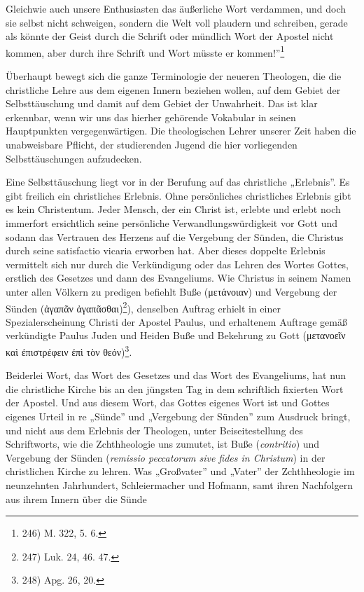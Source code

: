 \hfill {}\par Gleichwie auch unsere Enthusiasten das äußerliche Wort verdammen, und doch sie selbst nicht schweigen, sondern die Welt voll plaudern und schreiben, gerade als könnte der Geist durch die Schrift oder mündlich Wort der Apostel nicht kommen, aber durch ihre Schrift und Wort müsste er kommen!''\footnote{246) M. 322, 5. 6.}\par Überhaupt bewegt sich die ganze Terminologie der neueren Theologen, die die christliche Lehre aus dem eigenen Innern beziehen wollen, auf dem Gebiet der Selbsttäuschung und damit auf dem Gebiet der Unwahrheit. Das ist klar erkennbar, wenn wir uns das hierher gehörende Vokabular in seinen Hauptpunkten vergegenwärtigen. Die theologischen Lehrer unserer Zeit haben die unabweisbare Pflicht, der studierenden Jugend die hier vorliegenden Selbsttäuschungen aufzudecken.\par Eine Selbsttäuschung liegt vor in der Berufung auf das christliche „Erlebnis''. Es gibt freilich ein christliches Erlebnis. Ohne persönliches christliches Erlebnis gibt es kein Christentum. Jeder Mensch, der ein Christ ist, erlebte und erlebt noch immerfort ersichtlich seine persönliche Verwandlungswürdigkeit vor Gott und sodann das Vertrauen des Herzens auf die Vergebung der Sünden, die Christus durch seine satisfactio vicaria erworben hat. Aber dieses doppelte Erlebnis vermittelt sich nur durch die Verkündigung oder das Lehren des Wortes Gottes, erstlich des Gesetzes und dann des Evangeliums. Wie Christus in seinem Namen unter allen Völkern zu predigen befiehlt Buße (\textnormal{μετάνοιαν}) und Vergebung der Sünden (\textnormal{ἀγαπᾶν ἀγαπᾶσθαι})\footnote{247) Luk. 24, 46. 47.}), denselben Auftrag erhielt in einer Spezialerscheinung Christi der Apostel Paulus, und erhaltenem Auftrage gemäß verkündigte Paulus Juden und Heiden Buße und Bekehrung zu Gott (\textnormal{μετανοεῖν καὶ ἐπιστρέφειν ἐπὶ τὸν θεόν})\footnote{248) Apg. 26, 20.}.\par Beiderlei Wort, das Wort des Gesetzes und das Wort des Evangeliums, hat nun die christliche Kirche bis an den jüngsten Tag in dem schriftlich fixierten Wort der Apostel. Und aus diesem Wort, das Gottes eigenes Wort ist und Gottes eigenes Urteil in re „Sünde'' und „Vergebung der Sünden'' zum Ausdruck bringt, und nicht aus dem Erlebnis der Theologen, unter Beiseitestellung des Schriftworts, wie die Zchthheologie uns zumutet, ist Buße (\textit{contritio}) und Vergebung der Sünden (\textit{remissio peccatorum sive fides in Christum}) in der christlichen Kirche zu lehren. Was „Großvater'' und „Vater'' der Zchthheologie im neunzehnten Jahrhundert, Schleiermacher und Hofmann, samt ihren Nachfolgern aus ihrem Innern über die Sünde